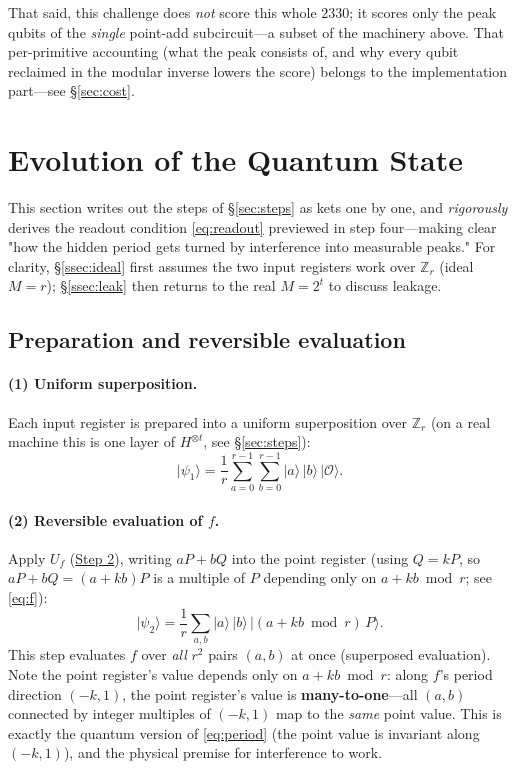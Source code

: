 \documentclass[11pt]{article}
\newcommand{\secref}[1]{\hyperref[#1]{\S\ref*{#1}}}
\begin{document}
That said, this challenge does \emph{not} score this whole $2330$; it scores only the peak qubits of the \emph{single} point-add subcircuit---a subset of the machinery above. That per-primitive accounting (what the peak consists of, and why every qubit reclaimed in the modular inverse lowers the score) belongs to the implementation part---see \secref{sec:cost}.

\section{Evolution of the Quantum State}
\label{sec:evolve}

This section writes out the steps of \secref{sec:steps} as kets one by one, and \emph{rigorously} derives the readout condition \eqref{eq:readout} previewed in step four---making clear
"how the hidden period gets turned by interference into measurable peaks." For clarity, \secref{ssec:ideal} first assumes the two input registers work over $\mathbb{Z}_r$
(ideal $M=r$); \secref{ssec:leak} then returns to the real $M=2^t$ to discuss leakage.

\subsection{Preparation and reversible evaluation}

\paragraph{(1) Uniform superposition.} Each input register is prepared into a uniform superposition over $\mathbb{Z}_r$ (on a real machine this is one layer of $H^{\otimes t}$, see \secref{sec:steps}):
\begin{equation}
\lvert\psi_1\rangle=\frac{1}{r}\sum_{a=0}^{r-1}\sum_{b=0}^{r-1}\lvert a\rangle\,\lvert b\rangle\,\lvert \mathcal{O}\rangle .
\label{eq:s1}
\end{equation}

\paragraph{(2) Reversible evaluation of $f$.} Apply $U_f$ (\hyperref[step:eval]{Step 2}), writing $aP+bQ$ into the point register (using $Q=kP$, so
$aP+bQ=(a+kb)P$ is a multiple of $P$ depending only on $a+kb\bmod r$; see \eqref{eq:f}):
\begin{equation}
\lvert\psi_2\rangle=\frac{1}{r}\sum_{a,b}\lvert a\rangle\,\lvert b\rangle\,\bigl\lvert (a+kb\bmod r)\,P\bigr\rangle .
\label{eq:s2}
\end{equation}
This step evaluates $f$ over \emph{all} $r^2$ pairs $(a,b)$ at once (superposed evaluation). Note the point register's value depends only on $a+kb\bmod r$:
along $f$'s period direction $(-k,1)$, the point register's value is \textbf{many-to-one}---all $(a,b)$ connected by integer multiples of $(-k,1)$ map to the \emph{same}
point value. This is exactly the quantum version of \eqref{eq:period} (the point value is invariant along $(-k,1)$), and the physical premise for interference to work.
\end{document}
